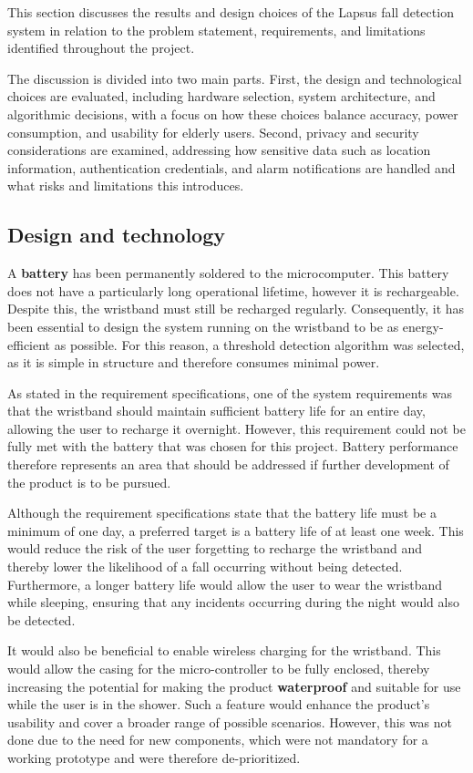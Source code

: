 This section discusses the results and design choices of the Lapsus fall detection system in relation to the problem statement, requirements, and limitations identified throughout the project. 

The discussion is divided into two main parts. First, the design and technological choices are evaluated, including hardware selection, system architecture, and algorithmic decisions, with a focus on how these choices balance accuracy, power consumption, and usability for elderly users. Second, privacy and security considerations are examined, addressing how sensitive data such as location information, authentication credentials, and alarm notifications are handled and what risks and limitations this introduces.

\subsection{Design and technology}
A \textbf{battery} has been permanently soldered to the microcomputer. This battery does not have a particularly long operational lifetime, however it is rechargeable. Despite this, the wristband must still be recharged regularly. Consequently, it has been essential to design the system running on the wristband to be as energy-efficient as possible. For this reason, a threshold detection algorithm was selected, as it is simple in structure and therefore consumes minimal power.

As stated in the requirement specifications, one of the system requirements was that the wristband should maintain sufficient battery life for an entire day, allowing the user to recharge it overnight. However, this requirement could not be fully met with the battery that was chosen for this project. Battery performance therefore represents an area that should be addressed if further development of the product is to be pursued.

Although the requirement specifications state that the battery life must be a minimum of one day, a preferred target is a battery life of at least one week. This would reduce the risk of the user forgetting to recharge the wristband and thereby lower the likelihood of a fall occurring without being detected. Furthermore, a longer battery life would allow the user to wear the wristband while sleeping, ensuring that any incidents occurring during the night would also be detected.

It would also be beneficial to enable wireless charging for the wristband. This would allow the casing for the micro-controller to be fully enclosed, thereby increasing the potential for making the product \textbf{waterproof} and suitable for use while the user is in the shower. Such a feature would enhance the product's usability and cover a broader range of possible scenarios. However, this was not done due to the need for new components, which were not mandatory for a working prototype and were therefore de-prioritized.

